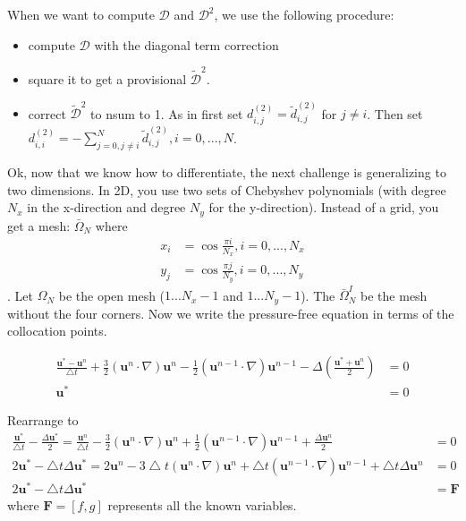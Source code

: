 \documentclass[12pt]{article}
\begin{document}
When we want to compute $\mathcal{D}$ and $\mathcal{D}^2$, we use the following procedure:
\begin{itemize}
    \item compute $\mathcal{D}$ with the diagonal term correction
    \item square it to get a provisional $\tilde{\mathcal{D}}^2$.
    \item correct $\tilde{\mathcal{D}}^2$ to nsum to 1. As in first set $d^{(2)}_{i,j} = \tilde{d}^{(2)}_{i,j}$ for $j \neq i$. Then set $d^{(2)}_{i,i} = -\sum_{j=0, j\neq i}^{N} \tilde{d}^{(2)}_{i,j}, i = 0,..., N$.
\end{itemize}

Ok, now that we know how to differentiate, the next challenge is generalizing to two dimensions. In 2D, you use two sets of Chebyshev polynomials (with degree $N_x$ in the x-direction and degree $N_y$ for the y-direction). Instead of a grid, you get a mesh:
$\bar{\Omega}_N$ where
\begin{align*}
    x_i &= \cos \frac{\pi i}{N_x}, i = 0, ..., N_x \\
    y_j &= \cos \frac{\pi j}{N_y}, i = 0, ..., N_y
\end{align*}
. Let $\Omega_N$ be the open mesh ($1...N_x-1$ and $1...N_y-1$). The $\bar{\Omega}^I_N$ be the mesh without the four corners. Now we write the pressure-free equation in terms of the collocation points.

\begin{align*}
    \frac{\mathbf{u}^{*} - \mathbf{u}^n}{\bigtriangleup t} + \frac{3}{2}(\mathbf{u}^n \cdot \nabla)\mathbf{u}^n - \frac{1}{2}(\mathbf{u}^{n-1} \cdot \nabla)\mathbf{u}^{n-1} - \Delta(\frac{\mathbf{u}^{*} + \mathbf{u}^n}{2}) &= 0 \\
    \mathbf{u}^{*} &= 0
\end{align*}

Rearrange to
\begin{align*}
\frac{\mathbf{u}^*}{{\bigtriangleup t}} - \frac{\Delta \mathbf{u}^*}{2} = \frac{\mathbf{u}^n}{\bigtriangleup t} - \frac{3}{2}(\mathbf{u}^n \cdot \nabla)\mathbf{u}^n + \frac{1}{2}(\mathbf{u}^{n-1} \cdot \nabla)\mathbf{u}^{n-1} + \frac{\Delta \mathbf{u}^n}{2} &= 0 \\
2\mathbf{u}^* - \bigtriangleup t \Delta \mathbf{u}^* = 2\mathbf{u}^n - 3\bigtriangleup t(\mathbf{u}^n \cdot \nabla)\mathbf{u}^n + \bigtriangleup t(\mathbf{u}^{n-1} \cdot \nabla)\mathbf{u}^{n-1} + \bigtriangleup t\Delta \mathbf{u}^n &= 0 \\
2\mathbf{u}^* - \bigtriangleup t \Delta \mathbf{u}^* &= \mathbf{F}
\end{align*}
where $\mathbf{F} = [f, g]$ represents all the known variables.
\end{document}
